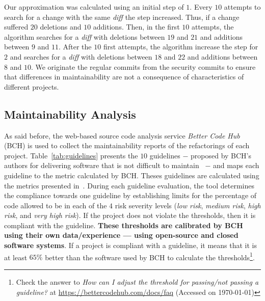 \documentclass[sigconf,review]{acmart}
\begin{document}
Our approximation was calculated using an initial step of $1$. Every $10$ attempts to search for 
a change with the same \emph{diff} the step increased. Thus, if a change suffered $20$ deletions 
and $10$ additions. Then, in the first $10$ attempts, the algorithm searches for a \emph{diff} with 
deletions between $19$ and $21$ and additions between $9$ and $11$. After the $10$ first attempts, 
the algorithm increase the step for $2$ and searches for a \emph{diff} with deletions between $18$ and $22$ and additions between 
$8$ and $10$. We originate the regular commits from the security
commits to ensure that differences in maintainability are not a consequence of
characteristics of different projects.

\subsection{Maintainability Analysis}

As said before, the web-based source code analysis service \emph{Better Code
Hub} (BCH) is used to collect the maintainability reports of the refactorings of
each project. Table~\ref{tab:guidelines} presents the $10$ guidelines $-$ proposed
by BCH's authors for delivering software that is not difficult to
maintain~\cite{Visser:2016:OREILLY} $-$ and maps each guideline to the metric 
calculated by BCH. Theses guidelines are calculated using the metrics 
presented in~\cite{criteria:2017}. During each guideline evaluation, the tool
determines the compliance towards one guideline by establishing limits for the
percentage of code allowed to be in each of the $4$ risk severity levels
(\emph{low risk}, \emph{medium risk}, \emph{high risk}, and \emph{very high
risk}). If the project does not violate the thresholds, then it is compliant
with the guideline. \textbf{These thresholds are calibrated by BCH using their own
data/experience --- using open-source and closed software systems}. If a project is
compliant with a guideline, it means that it is at least $65\%$ better than the
software used by BCH to calculate the thresholds\footnote{Check the answer to
\emph{How can I adjust the threshold for passing/not passing a guideline?} at
\url{https://bettercodehub.com/docs/faq} (Accessed on \today{})}.
\end{document}
